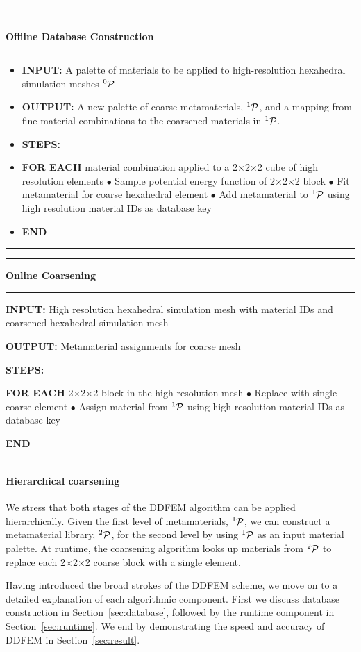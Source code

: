 \hrule~\\
\textbf{Offline Database Construction}\\
\hrule
\begin{itemize}
	\item \textbf{INPUT:} A palette of materials to be applied to high-resolution hexahedral simulation meshes $^0\mathcal{P}$
	\item \textbf{OUTPUT:} A new palette of coarse metamaterials, $^1\mathcal{P}$, and a mapping from fine material combinations to the coarsened materials in $^1\mathcal{P}$. 
	\item \textbf{STEPS:}
	\item \textbf{FOR EACH} material combination applied to a 2$\times$2$\times$2 cube of high resolution elements
	\subitem $\bullet$ Sample potential energy function of 2$\times$2$\times$2 block
	\subitem $\bullet$ Fit metamaterial for coarse hexahedral element
	\subitem $\bullet$ Add metamaterial to $^1\mathcal{P}$ using high resolution 
	\subitem material IDs as database key
	\item \textbf{END}
\end{itemize}
\vspace{1mm}
\hrule
\vspace{1mm}
\hrule
\textbf{Online Coarsening}
\vspace{1mm}
\hrule
\begin{compactitem}
	\item \textbf{INPUT:} High resolution hexahedral simulation mesh with 
	\subitem material IDs and
	\subitem coarsened hexahedral simulation mesh 
	\item \textbf{OUTPUT:} Metamaterial assignments for coarse mesh
	\item \textbf{STEPS:}
	\item \textbf{FOR EACH} 2$\times$2$\times$2 block in the high resolution mesh
	\subitem $\bullet$ Replace with single coarse element
	\subitem $\bullet$ Assign material from $^1\mathcal{P}$ using high resolution 
	\subitem material IDs as database key 
	\item \textbf{END}
\end{compactitem}
\vspace{1mm}
\hrule

\paragraph{Hierarchical coarsening}
We stress that both stages of the DDFEM algorithm can be applied hierarchically. Given the first level of metamaterials, $^1\mathcal{P}$, we can construct a metamaterial library, $^2\mathcal{P}$, for the second level by using $^1\mathcal{P}$ as an input material palette. At runtime, the coarsening algorithm looks up materials from $^2\mathcal{P}$ to replace each 2$\times$2$\times$2 coarse block with a single element.

Having introduced the broad strokes of the DDFEM scheme, we move on to a detailed explanation of each algorithmic component. First we discuss database construction in Section~\ref{sec:database}, followed by the runtime component in Section~\ref{sec:runtime}. We end by demonstrating the speed and accuracy of DDFEM in Section~\ref{sec:result}.